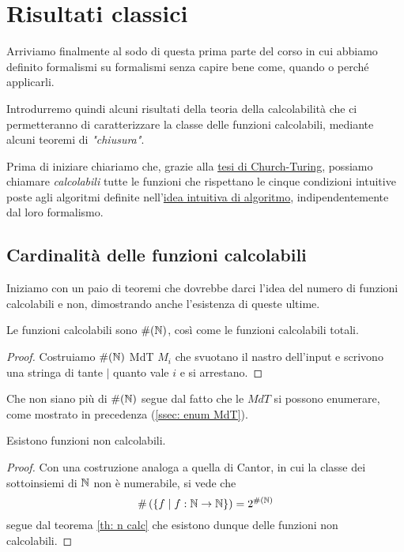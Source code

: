 \section{Risultati classici}
Arriviamo finalmente al sodo di questa prima parte del corso in
cui abbiamo definito formalismi su formalismi senza capire bene
come, quando o perché applicarli.

Introdurremo quindi alcuni risultati della teoria della
calcolabilità che ci permetteranno di caratterizzare la classe
delle funzioni calcolabili, mediante alcuni teoremi di
\emph{"chiusura"}.

Prima di iniziare chiariamo che, grazie alla
\hyperref[th: church-turing]{tesi di Church-Turing}, possiamo
chiamare \emph{calcolabili} tutte le funzioni che rispettano
le cinque condizioni intuitive poste agli algoritmi definite
nell'\hyperref[sec: algoritmo]{idea intuitiva di algoritmo},
indipendentemente dal loro formalismo.

\subsection{Cardinalità delle funzioni calcolabili}
Iniziamo con un paio di teoremi che dovrebbe darci l'idea del
numero di funzioni calcolabili e non, dimostrando anche
l'esistenza di queste ultime.

\begin{theorem} \label{th: n calc}
	Le funzioni calcolabili sono $\#(\mathbb{N})$, così come le funzioni
	calcolabili totali.
	\begin{proof}
		Costruiamo $\#(\mathbb{N})$ MdT $M_i$ che svuotano il nastro
		dell'input e scrivono una stringa di tante $|$ quanto
		vale $i$ e si arrestano.
	\end{proof}
\end{theorem}

Che non siano più di $\#(\mathbb{N})$ segue dal fatto che le $MdT$
si possono enumerare, come mostrato in precedenza
(\ref{ssec: enum MdT}).

\begin{theorem}
	Esistono funzioni non calcolabili.
	\begin{proof}
		Con una costruzione analoga a quella di Cantor, in cui
		la classe dei sottoinsiemi di $\mathbb{N}$ non è numerabile,
		si vede che
		\[
			\# \left( \{ f \mid f : \mathbb{N} \to \mathbb{N} \} \right) =
			2^{\#(\mathbb{N})}
		\]
		segue dal teorema \ref{th: n calc} che esistono dunque
		delle funzioni non calcolabili.
	\end{proof}
\end{theorem}

